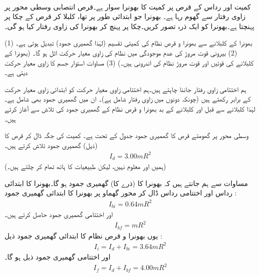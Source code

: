  \\
 کمیت  اور رداس   کے قرص پر کمیت   کا بھونرا سوار ہے۔قرص انتصابی وسطی   محور  پر زاوی رفتار سے گھوم رہا ہے۔ بھونرا جو  ابتدائی طور  پر  تھا، کلبلا  کر قرص کے چکا پر  پہنچتا ہے۔بھونرا کو ایک ذرہ تصور کریں۔چکا پر  پہنچ کر بھونرا کی زاوی رفتار کیا ہو گی۔
 
 (1) بھونرا کے کلبلانے سے  بھونرا و قرص نظام کی کمیتی تقسیم (لہٰذا گھمیری جمود)   تبدیل  ہوتی  ہے۔ (2)  بیرونی قوت مروڑ  کی عدم موجودگی میں نظام کی زاوی  معیار حرکت اٹل ہو گا۔ (بھونرا کے کلبلانے کی قوتیں اور قوت مروڑ نظام کی اندرونی ہیں۔) (3)  مساوات      استوار جسم کا زاوی معیار حرکت دیتی ہے۔
 
 \quad
 ہم اختتامی زاوی رفتار جاننا چاہتے ہیں۔ہم اختتامی  زاوی معیار حرکت  کو ابتدائی زاوی معیار حرکت  کے برابر رکھتے ہیں (چونکہ دونوں میں زاوی رفتار شامل ہے)۔  ان میں گھمیری جمود بھی شامل ہے۔لہٰذا کلبلانے سے قبل اور کلبلانے کے بد بھونرا و قرص نظام کے  گھمیری جمود  کی تلاش سے آغاز  کرتے ہیں۔
 
 وسطی محور پر گھومتے قرص کا گھمیری جمود جدول  کے تحت  ہے۔ کمیت  کی جگہ  ڈال کر قرص کا (ذیل) گھمیری جمود تلاش کرتے ہیں۔
 \begin{align}
 I_d=3.00mR^2
 \end{align}
 (ہمیں  اور  معلوم نہیں، لیکن طبیعیات کا ہاتھ تھام کر چلتے ہیں۔)
 
 مساوات  سے ہم جانتے ہیں کہ بھونرا کا  (ذرے کا) گھمیری جمود  ہو گا۔بھونرا کا ابتدائی رداس  اور اختتامی رداس  ڈال کر محور گھماو پر  بھونرا کا ابتدائی گھمیری جمود :
 \begin{align}
 I_{bi}=0.64mR^2
 \end{align}
 اور اختتامی گھمیری جمود   حاصل کرتے ہیں۔
 \begin{align}
 I_{bf}=mR^2
 \end{align}
 یوں بھونرا و قرص نظام  کا ابتدائی گھمیری جمود  ذیل :
 \begin{align}
 I_i=I_d+I_{bi}=3.64mR^2
 \end{align}
 اور  اختتامی گھمیری جمود  ذیل ہو گا۔
 \begin{align}
 I_f=I_d+I_{bf}=4.00mR^2
 \end{align}
 
